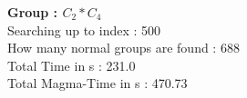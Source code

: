 \textbf{Group : $C_2*C_4$}\\
Searching up to index : 500\\
How many normal groups are found : 688\\
Total Time in s : 231.0\\
Total Magma-Time in s : 470.73\\
